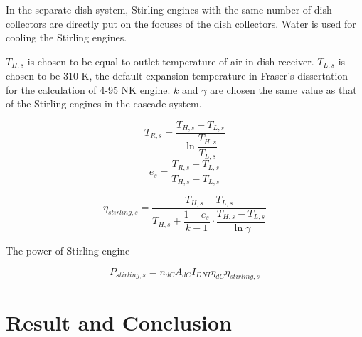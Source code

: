 \documentclass{article}
\begin{document}
In the separate dish system, Stirling engines with the same number of dish collectors are directly put on the focuses of the dish collectors. Water is used for cooling the Stirling engines.

$T_{H,s}$ is chosen to be equal to outlet temperature of air in dish receiver. $T_{L,s}$ is chosen to be 310 K, the default expansion temperature in Fraser's dissertation~\cite{Fraser2008} for the calculation of 4-95 NK\uppercase\expandafter{} engine. $k$ and $\gamma$ are chosen the same value as that of the Stirling engines in the cascade system.

\begin{equation*}
	T_{R,s}=\dfrac{T_{H,s}-T_{L,s}}{\ln\dfrac{T_{H,s}}{T_{L,s}}}
\end{equation*}
\begin{equation*}
	e_{s}=\dfrac{T_{R,s}-T_{L,s}}{T_{H,s}-T_{L,s}}
\end{equation*}

\begin{equation*}
	\eta_{stirling,s}=\dfrac{T_{H,s}-T_{L,s}}{T_{H,s}+\dfrac{1-e_{s}}{k-1}\cdot\dfrac{T_{H,s}-T_{L,s}}{\ln\gamma}}
\end{equation*}

The power of Stirling engine

\begin{equation*}
	P_{stirling,s}=n_{dC}A_{dC}I_{DNI}\eta_{dC}\eta_{stirling,s}
\end{equation*}

\section{Result and Conclusion}

\printnomenclature[2.5cm]{}
\clearpage



\end{document}
